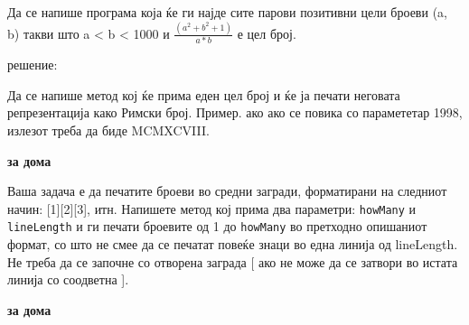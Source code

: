 

\lfoot{}
\cfoot{\thepage}
\rfoot{}
\usepackage{fancyvrb}
\usepackage{xcolor}
\usepackage{textcomp}


\begin{questions}

\question

Да се напише програма која ќе ги најде сите парови позитивни цели броеви (a, b)
такви што a < b < 1000 и $\frac{(a^2 + b^2 + 1)}{a * b}$ е цел број.

решение:



\question

Да се напише метод кој ќе прима еден цел број и ќе ја печати неговата
репрезентација како Римски број. Пример. ако ако се повика со парамететар 1998,
излезот треба да биде MCMXCVIII.

\textbf{за дома}

\question
Ваша задача е да печатите броеви во средни загради, форматирани на следниот
начин: [1][2][3], итн. Напишете метод кој прима два параметри: \texttt{howMany} и
\texttt{lineLength} и ги печати броевите од 1 до \texttt{howMany} во претходно опишаниот формат,
со што не смее да се печатат повеќе знаци во една линија од lineLength. Не треба
да се започне со отворена заграда [ ако не може да се затвори во истата линија
со соодветна ].

\textbf{за дома}

\end{questions}



